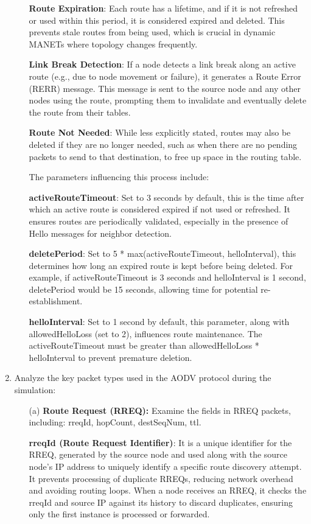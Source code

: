 \documentclass[a4paper]{article}
\begin{document}
\begin{enumerate}
\begin{itemize}
				\textbf{Route Expiration}: Each route has a lifetime, and if it is not refreshed or used within this period, it is considered expired and deleted. This prevents stale routes from being used, which is crucial in dynamic MANETs where topology changes frequently.
				
				\textbf{Link Break Detection}: If a node detects a link break along an active route (e.g., due to node movement or failure), it generates a Route Error (RERR) message. This message is sent to the source node and any other nodes using the route, prompting them to invalidate and eventually delete the route from their tables.
				
				\textbf{Route Not Needed}: While less explicitly stated, routes may also be deleted if they are no longer needed, such as when there are no pending packets to send to that destination, to free up space in the routing table.
				
				The parameters influencing this process include:
				
				\textbf{activeRouteTimeout}: Set to 3 seconds by default, this is the time after which an active route is considered expired if not used or refreshed. It ensures routes are periodically validated, especially in the presence of Hello messages for neighbor detection.
			
				\textbf{deletePeriod}: Set to 5 * max(activeRouteTimeout, helloInterval), this determines how long an expired route is kept before being deleted. For example, if activeRouteTimeout is 3 seconds and helloInterval is 1 second, deletePeriod would be 15 seconds, allowing time for potential re-establishment.
				
				\textbf{helloInterval}: Set to 1 second by default, this parameter, along with allowedHelloLoss (set to 2), influences route maintenance. The activeRouteTimeout must be greater than allowedHelloLoss * helloInterval to prevent premature deletion.
				
			\end{itemize}
			
			\item Analyze the key packet types used in the AODV protocol during the simulation:
			
			\begin{itemize}
				\item[(a)] \textbf{Route Request (RREQ):} Examine the fields in RREQ packets, including: rreqId, hopCount, destSeqNum, ttl.
				
				\textbf{rreqId (Route Request Identifier)}:
				It is a unique identifier for the RREQ, generated by the source node and used along with the source node's IP address to uniquely identify a specific route discovery attempt.
				It prevents processing of duplicate RREQs, reducing network overhead and avoiding routing loops. When a node receives an RREQ, it checks the rreqId and source IP against its history to discard duplicates, ensuring only the first instance is processed or forwarded.
				

\end{itemize}
\end{enumerate}
\end{document}
